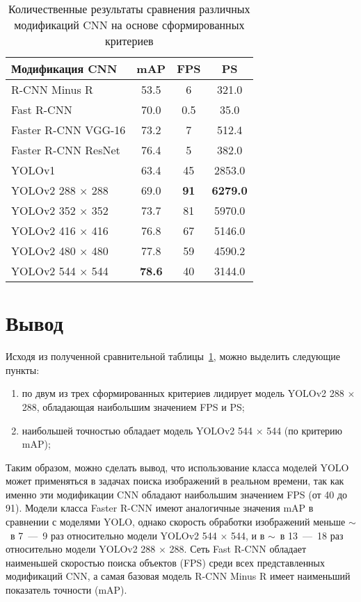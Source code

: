 \clearpage
\begin{table}[!ht]
	\centering
	\caption{\label{table1} Количественные результаты сравнения различных модификаций CNN на основе сформированных критериев}
	\begin{tabularx}{\textwidth}{|X|c|c|c|}
		\hline
		Модификация CNN & mAP & FPS & PS \\ \hline
		R-CNN Minus R & 53.5 & 6 & 321.0 \\ \hline
		Fast R-CNN & 70.0 & 0.5 & 35.0 \\ \hline
		Faster R-CNN VGG-16 & 73.2 & 7 & 512.4 \\ \hline
		Faster R-CNN ResNet & 76.4 & 5 & 382.0 \\ \hline
		YOLOv1 & 63.4 & 45 & 2853.0 \\ \hline
		YOLOv2 288 $\times$ 288 & 69.0 & \textbf{91} & \textbf{6279.0} \\ \hline
		YOLOv2 352 $\times$ 352 & 73.7 & 81 & 5970.0 \\ \hline
		YOLOv2 416 $\times$ 416 & 76.8 & 67 & 5146.0 \\ \hline
		YOLOv2 480 $\times$ 480 & 77.8 & 59 & 4590.2 \\ \hline
		YOLOv2 544 $\times$ 544 & \textbf{78.6} & 40 & 3144.0 \\ \hline
	\end{tabularx}
\end{table}

\section{Вывод}

Исходя из полученной сравнительной таблицы~\ref{table1}, можно выделить следующие пункты:
\begin{enumerate}
	\item по двум из трех сформированных критериев лидирует модель YOLOv2 288 $\times$ 288, обладающая наибольшим значением FPS и PS;
	\item наибольшей точностью обладает модель YOLOv2 544 $\times$ 544 (по критерию mAP);
\end{enumerate}

Таким образом, можно сделать вывод, что использование класса моделей YOLO может применяться в задачах поиска изображений в реальном времени, так как именно эти модификации CNN обладают наибольшим значением FPS (от 40 до 91).
Модели класса Faster R-CNN имеют аналогичные значения mAP в сравнении с моделями YOLO, однако скорость обработки изображений меньше $\sim$~в  7~---~9 раз относительно модели YOLOv2 544 $\times$ 544, и в $\sim$~в  13~---~18 раз относительно модели YOLOv2 288 $\times$ 288.
Сеть Fast R-CNN обладает наименьшей скоростью поиска объектов (FPS) среди всех представленных модификаций CNN, а самая базовая модель R-CNN Minus R имеет наименьший показатель точности (mAP).